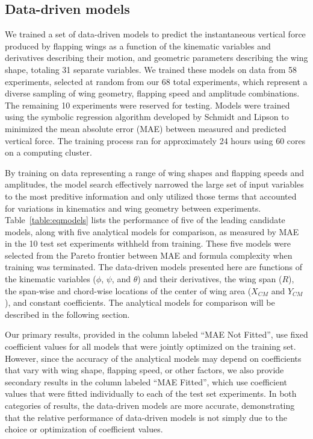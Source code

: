 \documentclass{article}
\begin{document}
\subsection*{Data-driven models}
We trained a set of data-driven models to predict the instantaneous vertical
force produced by flapping wings as a function of the kinematic variables and
derivatives describing their motion, and geometric parameters describing the
wing shape, totaling 31 separate variables. We trained these models on data from
58 experiments, selected at random from our 68 total experiments, which
represent a diverse sampling of wing geometry, flapping speed and amplitude
combinations. The remaining 10 experiments were reserved for testing. Models
were trained using the symbolic regression algorithm developed by Schmidt and
Lipson \cite{schmidt2009distilling} to minimized the mean absolute error (MAE)
between measured and predicted vertical force. The training process ran for
approximately 24 hours using 60 cores on a computing cluster.

By training on data representing a range of wing shapes and flapping speeds and
amplitudes, the model search effectively narrowed the large set of input
variables to the most preditive information and only utilized those terms that
accounted for variations in kinematics and wing geometry between experiments.
Table~\ref{table:eqmodels} lists the performance of five of the leading
candidate models, along with five analytical models for comparison, as measured
by MAE in the 10 test set experiments withheld from training. These five models
were selected from the Pareto frontier between MAE and formula complexity when
training was terminated. The data-driven models presented here are functions of
the kinematic variables ($\phi$, $\psi$, and $\theta$) and their derivatives,
the wing span ($R$), the span-wise and chord-wise locations of the center of
wing area ($X_{CM}$ and $Y_{CM}$), and constant coefficients. The analytical
models for comparison will be described in the following section.

Our primary results, provided in the column labeled ``MAE Not Fitted'', use
fixed coefficient values for all models that were jointly optimized on the
training set.  However, since the accuracy of the analytical models may depend
on coefficients that vary with wing shape, flapping speed, or other factors, we
also provide secondary results in the column labeled ``MAE Fitted'', which use
coefficient values that were fitted individually to each of the test set
experiments. In both categories of results, the data-driven models are more
accurate, demonstrating that the relative performance of data-driven models is
not simply due to the choice or optimization of coefficient values.
\end{document}
